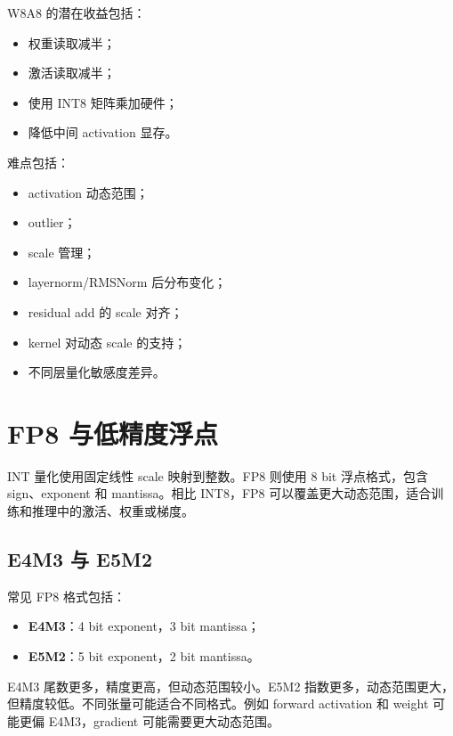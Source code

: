 W8A8 的潜在收益包括：

\begin{itemize}
\item 权重读取减半；
\item 激活读取减半；
\item 使用 INT8 矩阵乘加硬件；
\item 降低中间 activation 显存。
\end{itemize}

难点包括：

\begin{itemize}
\item activation 动态范围；
\item outlier；
\item scale 管理；
\item layernorm/RMSNorm 后分布变化；
\item residual add 的 scale 对齐；
\item kernel 对动态 scale 的支持；
\item 不同层量化敏感度差异。
\end{itemize}

\section{FP8 与低精度浮点}
\label{sec:fp8-low-precision-floating-point}

INT 量化使用固定线性 scale 映射到整数。FP8 则使用 8 bit 浮点格式，包含 sign、exponent 和 mantissa。相比 INT8，FP8 可以覆盖更大动态范围，适合训练和推理中的激活、权重或梯度。

\subsection{E4M3 与 E5M2}
\label{subsec:e4m3-e5m2}

常见 FP8 格式包括：

\begin{itemize}
\item \textbf{E4M3}：4 bit exponent，3 bit mantissa；
\item \textbf{E5M2}：5 bit exponent，2 bit mantissa。
\end{itemize}

E4M3 尾数更多，精度更高，但动态范围较小。E5M2 指数更多，动态范围更大，但精度较低。不同张量可能适合不同格式。例如 forward activation 和 weight 可能更偏 E4M3，gradient 可能需要更大动态范围。

